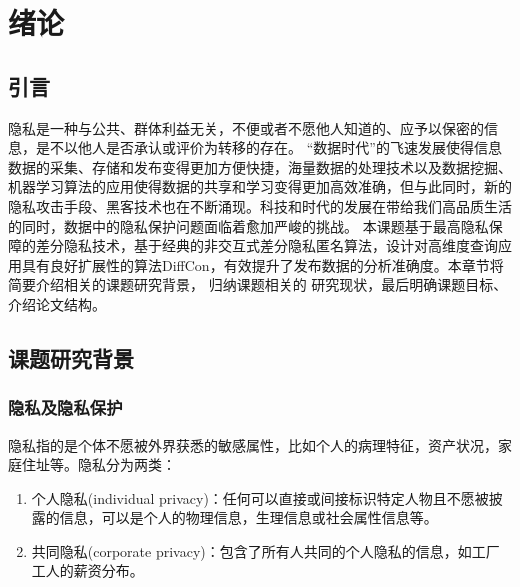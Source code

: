 
\chapter{绪论}
\label{chap:introduction}

\section{引言}
\label{sec:objective}
隐私是一种与公共、群体利益无关，不便或者不愿他人知道的、应予以保密的信息，是不以他人是否承认或评价为转移的存在。
“数据时代”的飞速发展使得信息数据的采集、存储和发布变得更加方便快捷，海量数据的处理技术以及数据挖掘、机器学习算法的应用使得数据的共享和学习变得更加高效准确，但与此同时，新的隐私攻击手段、黑客技术也在不断涌现。科技和时代的发展在带给我们高品质生活的同时，数据中的隐私保护问题面临着愈加严峻的挑战。
本课题基于最高隐私保障的差分隐私技术，基于经典的非交互式差分隐私匿名算法，设计对高维度查询应用具有良好扩展性的算法DiffCon，有效提升了发布数据的分析准确度。本章节将简要介绍相关的课题研究背景，
归纳课题相关的
研究现状，最后明确课题目标、介绍论文结构。


\section{课题研究背景}

\subsection{隐私及隐私保护}  %

隐私指的是个体不愿被外界获悉的敏感属性，比如个人的病理特征，资产状况，家庭住址等。隐私分为两类\cite{Defining Privacy for Data}：
\begin{enumerate}
	\item 个人隐私(individual privacy)：任何可以直接或间接标识特定人物且不愿被披露的信息，可以是个人的物理信息，生理信息或社会属性信息等。
	\item 共同隐私(corporate privacy)：包含了所有人共同的个人隐私的信息，如工厂工人的薪资分布。
\end{enumerate}

